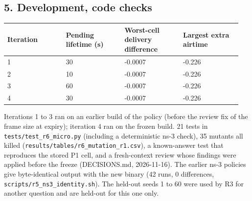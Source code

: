 \subsection*{5. Development, code checks}

{\scriptsize\raggedright
\begin{longtable}{p{0.237\linewidth}p{0.237\linewidth}p{0.237\linewidth}p{0.237\linewidth}}
\toprule
Iteration & Pending lifetime (s) & Worst-cell delivery difference & Largest extra airtime \\
\midrule
\endhead
1 & 30 & -0.0007 & -0.226 \\
2 & 10 & -0.0007 & -0.226 \\
3 & 60 & -0.0007 & -0.226 \\
4 & 30 & -0.0007 & -0.226 \\
\bottomrule
\end{longtable}}

Iterations 1 to 3 ran on an earlier build of the policy (before the review fix of the frame size at expiry); iteration 4 ran on the frozen build. 21 tests in \texttt{tests/test\_r6\_micro.py} (including a deterministic ns-3 check), 35 mutants all killed (\texttt{results/tables/r6\_mutation\_r1.csv}), a known-answer test that reproduces the stored P1 cell, and a fresh-context review whose findings were applied before the freeze (DECISIONS.md, 2026-11-16). The earlier ns-3 policies give byte-identical output with the new binary (42 runs, 0 differences, \texttt{scripts/r5\_ns3\_identity.sh}). The held-out seeds 1 to 60 were used by R3 for another question and are held-out for this one only.

